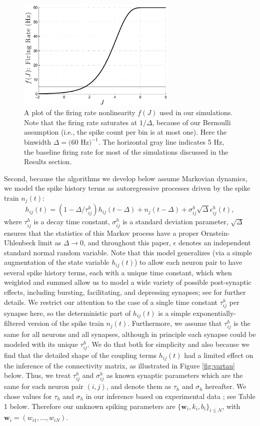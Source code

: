 \documentclass[aoas,preprint]{imsart}
\newcommand{\w}{w}
\newcommand{\bw}{\mathbf{\w}}
\begin{document}
\begin{figure}[t!]
\centering \includegraphics[width=3in]{../figs/fr_vs_J}
\caption{A plot of the firing rate nonlinearity $f(J)$ used in our
  simulations.  Note that the firing rate saturates at $1/\Delta$,
  because of our Bernoulli assumption (i.e., the spike count per bin
  is at most one). Here the binwidth $\Delta = (60$ Hz$)^{-1}$.  The
  horizontal gray line indicates 5 Hz, the baseline firing rate for
  most of the simulations discussed in the Results section.}
\label{fig:egfluor}
\end{figure}

Second, because the algorithms we develop below assume Markovian
dynamics, we model the spike history terms as autoregressive
processes driven by the spike train $n_j(t)$:
\begin{equation} \label{eqn:h:definition}
h_{ij}(t) = (1- \Delta/\tau^h_{ij}) h_{ij}(t- \Delta) +n_j(t-\Delta) +
  \sigma^h_{ij} \sqrt{\Delta} \epsilon^h_{ij}(t),
\end{equation}
where $\tau^h_{ij}$ is a decay time constant, $\sigma^h_{ij}$ is a
standard deviation parameter, $\sqrt{\Delta}$ ensures that the
statistics of this Markov process have a proper Ornstein-Uhlenbeck
limit as $\Delta \to 0$, and throughout this paper, $\epsilon$ denotes
an independent standard normal random variable. Note that this model
generalizes (via a simple augmentation of the state variable
$h_{ij}(t)$) to allow each neuron pair to have several spike history
terms, each with a unique time constant, which when weighted and
summed allow us to model a wide variety of possible post-synaptic
effects, including bursting, facilitating, and depressing synapses;
see \cite{Vogelstein2009} for further details. We restrict our
attention to the case of a single time constant $\tau^h_{ij}$ per
synapse here, so the deterministic part of $h_{ij}(t)$ is a simple
exponentially-filtered version of the spike train
$n_j(t)$. Furthermore, we assume that $\tau^h_{ij}$ is the same for
all neurons and all synapses, although in principle each synapse could
be modeled with its unique $\tau^h_{ij}$. We do that both for
simplicity and also because we find that the detailed shape of the
coupling terms $h_{ij}(t)$ had a limited effect on the inference of
the connectivity matrix, as illustrated in Figure \ref{fig:vartau}
below. Thus, we treat $\tau^h_{ij}$ and $\sigma^h_{ij}$ as known
synaptic parameters which are the same for each neuron pair $(i,j)$,
and denote them as $\tau_h$ and $\sigma_h$ hereafter.  We chose values
for $\tau_h$ and $\sigma_h$ in our inference based on experimental
data \cite{Lefort2009}; see Table 1 below. Therefore our unknown
spiking parameters are $\{\bw_i,k_i,b_i\}_{i\leq N}$, with
$\bw_i=(\w_{i1},\ldots, \w_{iN})$.
\end{document}
